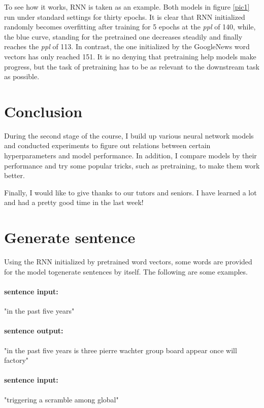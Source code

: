 \documentclass[11pt,a4paper]{article}
\begin{document}
To see how it works, RNN is taken as an example. Both models in figure \ref{pic1} run under standard settings for thirty epochs. It is clear that RNN initialized randomly becomes overfitting after training for 5 epochs at the \emph{ppl} of 140, while, the blue curve, standing for the pretrained one decreases steadily and finally reaches the \emph{ppl} of 113. In contrast, the one initialized by the GoogleNews word vectors has only reached 151. It is no denying that pretraining help models make progress, but the task of pretraining has to be as relevant to the downstream task as possible.


\section{Conclusion}
During the second stage of the course, I build up various neural network models and conducted experiments to figure out relations between certain hyperparameters and model performance.
In addition, I compare models by their performance and try some popular tricks, such as pretraining, to make them work better.

Finally, I would like to give thanks to our tutors and seniors.
I have learned a lot and had a pretty good time in the last week!





\appendix

\section{Generate sentence}

Using the RNN initialized by pretrained word vectors, some words are provided for the model togenerate sentences by itself. The following are some examples.

\paragraph{sentence input:}
"in the past five years"
\paragraph{sentence output:}
"in the past five years is three pierre wachter group board appear once will factory" 

\paragraph{sentence input:}
"triggering a scramble among global"
\end{document}
